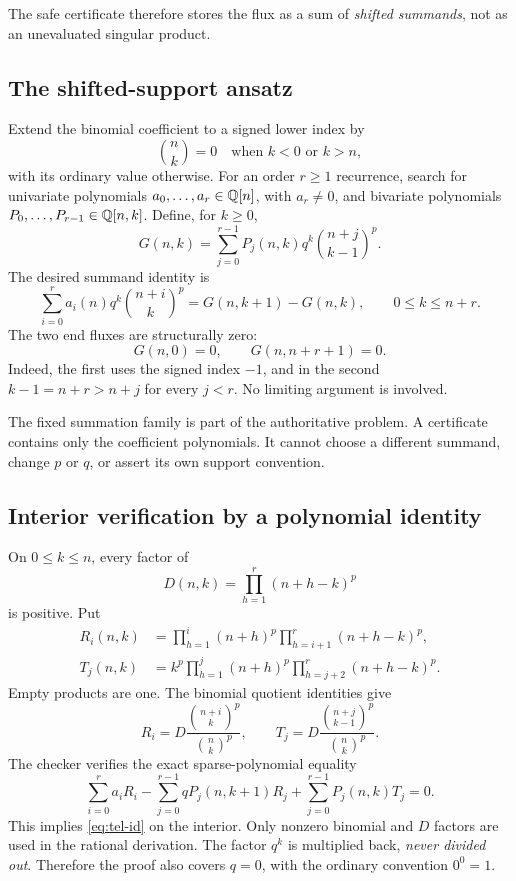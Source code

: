The safe certificate therefore stores the flux as a sum of \emph{shifted
summands}, not as an unevaluated singular product.

\subsection{The shifted-support ansatz}

Extend the binomial coefficient to a signed lower index by
\[
\binom nk=0\quad\text{when }k<0\text{ or }k>n,
\]
with its ordinary value otherwise. For an order $r\ge1$ recurrence, search for
univariate polynomials $a_0,\ldots,a_r\in\mathbb Q[n]$, with $a_r\ne0$, and bivariate
polynomials $P_0,\ldots,P_{r-1}\in\mathbb Q[n,k]$. Define, for $k\ge0$,
\begin{equation}\label{eq:flux}
G(n,k)=\sum_{j=0}^{r-1}P_j(n,k)q^k\binom{n+j}{k-1}^{p}.
\end{equation}
The desired summand identity is
\begin{equation}\label{eq:tel-id}
\sum_{i=0}^{r}a_i(n)q^k\binom{n+i}{k}^{p}
 =G(n,k+1)-G(n,k),\qquad 0\le k\le n+r.
\end{equation}
The two end fluxes are structurally zero:
\begin{equation}\label{eq:ends}
G(n,0)=0,\qquad G(n,n+r+1)=0.
\end{equation}
Indeed, the first uses the signed index $-1$, and in the second
$k-1=n+r>n+j$ for every $j<r$. No limiting argument is involved.

The fixed summation family is part of the authoritative problem. A certificate
contains only the coefficient polynomials. It cannot choose a different
summand, change $p$ or $q$, or assert its own support convention.

\subsection{Interior verification by a polynomial identity}

On $0\le k\le n$, every factor of
\[
D(n,k)=\prod_{h=1}^{r}(n+h-k)^p
\]
is positive. Put
\begin{align}
R_i(n,k)&=\prod_{h=1}^{i}(n+h)^p
          \prod_{h=i+1}^{r}(n+h-k)^p,\label{eq:Ri}\\
T_j(n,k)&=k^p\prod_{h=1}^{j}(n+h)^p
          \prod_{h=j+2}^{r}(n+h-k)^p.\label{eq:Tj}
\end{align}
Empty products are one. The binomial quotient identities give
\[
R_i=D\frac{\binom{n+i}k^p}{\binom nk^p},\qquad
T_j=D\frac{\binom{n+j}{k-1}^p}{\binom nk^p}.
\]
The checker verifies the exact sparse-polynomial equality
\begin{equation}\label{eq:interior}
\sum_{i=0}^{r}a_iR_i
-\sum_{j=0}^{r-1}qP_j(n,k+1)R_j
+\sum_{j=0}^{r-1}P_j(n,k)T_j=0.
\end{equation}
This implies \eqref{eq:tel-id} on the interior. Only nonzero binomial and
$D$ factors are used in the rational derivation. The factor $q^k$ is multiplied
back, \emph{never divided out}. Therefore the proof also covers $q=0$, with the
ordinary convention $0^0=1$.

